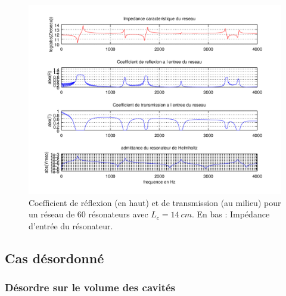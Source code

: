 \begin{figure}
\centering
\includegraphics[scale=1]{./images_chp1/ex_coef_rapport.png}
\caption{\label{ex_coef_RT} Coefficient de réflexion (en haut) et de transmission (au milieu) pour un réseau de 60 résonateurs avec $L_c=14~cm$. En bas : Impédance d'entrée du résonateur.}
\end{figure}

\subsection{Cas désordonné}

\subsubsection{Désordre sur le volume des cavités}

